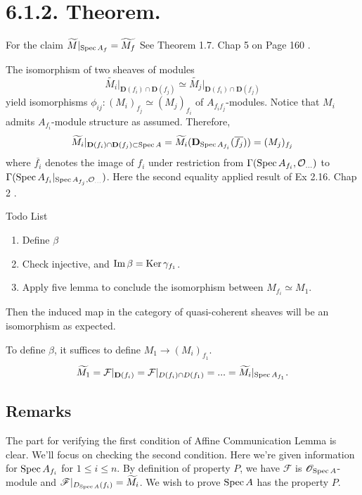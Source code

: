\section{6.1.2. Theorem.}

For the claim $\widetilde{M}\vert_{\operatorname{Spec} A_f}=\widetilde{M_f}$ See Theorem 1.7. Chap 5 on Page 160 \cite{qing2006algebraic}.

The isomorphism of two sheaves of modules 
\[\widetilde{M_i}\vert_{\mathbf D(f_i)\cap \mathbf D(f_j)}\simeq \widetilde{M_j}\vert_{\mathbf D(f_i)\cap \mathbf D(f_j)}\] yield isomorphisms $\phi_{ij}: (M_i)_{f_j}\simeq (M_j)_{f_i}$ of $A_{f_if_j}$-modules.
Notice that $M_i$ admits $A_{f_i}$-module structure as assumed. Therefore, 
\[\widetilde{M_i}\vert_{\mathbf D(f_i)\cap\mathbf D(f_j)\subset \operatorname{Spec} A}=\widetilde{M_i}(\mathbf D_{\operatorname{Spec} A_{f_i}}(\overline{f_j}))=(M_j)_{f_j}\] where $\overline{f_i}$ denotes the image of $f_i$ under restriction from $\Gamma(\operatorname{Spec} A_{f_i},\mathcal O_{...})$ to $\Gamma(\operatorname{Spec} A_{f_i}\vert_{\operatorname{Spec} A_{f_j}, \mathcal O_{...}})$. 
Here the second equality applied result of Ex 2.16. Chap 2 \cite{hartshorne2013algebraic}.

Todo List \begin{enumerate}
    \item Define $\beta$
    \item Check injective, and $\operatorname{Im} \beta=\operatorname{Ker} \gamma_{f_1}$.
    \item Apply five lemma to conclude the isomorphism between $M_{f_i}\simeq M_1$.
\end{enumerate}Then the induced map in the category of quasi-coherent sheaves will be an isomorphism as expected. 

To define $\beta$, it suffices to define $M_1\to (M_i)_{f_1}$.
\begin{align*}
    \widetilde{M_1}=\mathcal F\vert_{\mathbf D(f_i)}=\mathcal F\vert_{D(f_i)\cap D(f_1)}=...=\widetilde{M_i}\vert_{\operatorname{Spec} A_{f_1}}.
\end{align*}

\subsection{Remarks}

The part for verifying the first condition of Affine Communication Lemma is clear. We'll focus on checking the second condition. Here we're given information for $\operatorname{Spec} A_{f_i}$ for $1\leq i\leq n$. By definition of  property $P$, we have $\mathscr F$ is $\mathscr O_{\operatorname{Spec} A}$-module and $\mathscr F\vert_{D_{\operatorname{Spec} A}(f_i)}=\widetilde{M_i}$. We wish to prove $\operatorname{Spec} A$ has the property $P$. 

